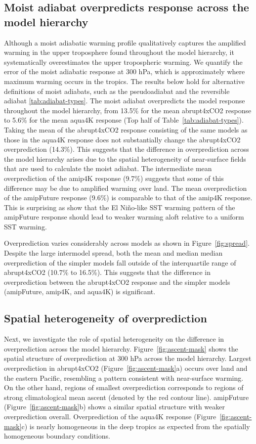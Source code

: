 \documentclass{ametsocV5}
\begin{document}
\subsection{Moist adiabat overpredicts response across the model hierarchy}
Although a moist adiabatic warming profile qualitatively captures the amplified warming in the upper troposphere found throughout the model hierarchy, it systematically overestimates the upper tropospheric warming. We quantify the error of the moist adiabatic response at 300 hPa, which is approximately where maximum warming occurs in the tropics. The results below hold for alternative definitions of moist adiabats, such as the pseudoadiabat and the reversible adiabat \ref{tab:adiabat-types}. The moist adiabat overpredicts the model response throughout the model hierarchy, from 13.5\% for the mean abrupt4xCO2 response to 5.6\% for the mean aqua4K response (Top half of Table~\ref{tab:adiabat-types}). Taking the mean of the abrupt4xCO2 response consisting of the same models as those in the aqua4K response does not substantially change the abrupt4xCO2 overprediction (14.3\%). This suggests that the difference in overprediction across the model hierarchy arises due to the spatial heterogeneity of near-surface fields that are used to calculate the moist adiabat. The intermediate mean overprediction of the amip4K response (9.7\%) suggests that some of this difference may be due to amplified warming over land. The mean overprediction of the amipFuture response (9.6\%) is comparable to that of the amip4K response. This is surprising as \citet{andrews-webb-2018} show that the El Niño-like SST warming pattern of the amipFuture response should lead to weaker warming aloft relative to a uniform SST warming.

Overprediction varies considerably across models as shown in Figure~\ref{fig:spread}. Despite the large intermodel spread, both the mean and median median overprediction of the simpler models fall outside of the interquartile range of abrupt4xCO2 (10.7\% to 16.5\%). This suggests that the difference in overprediction between the abrupt4xCO2 response and the simpler models (amipFuture, amip4K, and aqua4K) is significant. 

\subsection{Spatial heterogeneity of overprediction}
Next, we investigate the role of spatial heterogeneity on the difference in overprediction across the model hierarchy. Figure~\ref{fig:ascent-mask} shows the spatial structure of overprediction at 300 hPa across the model hierarchy. Largest overprediction in abrupt4xCO2 (Figure~\ref{fig:ascent-mask}a) occurs over land and the eastern Pacific, resembling a pattern consistent with near-surface warming. On the other hand, regions of smallest overprediction corresponds to regions of strong climatological mean ascent (denoted by the red contour line). amipFuture (Figure~\ref{fig:ascent-mask}b) shows a similar spatial structure with weaker overprediction overall. Overprediction of the aqua4K response (Figure~\ref{fig:ascent-mask}c) is nearly homogeneous in the deep tropics as expected from the spatially homogeneous boundary conditions.
\end{document}
